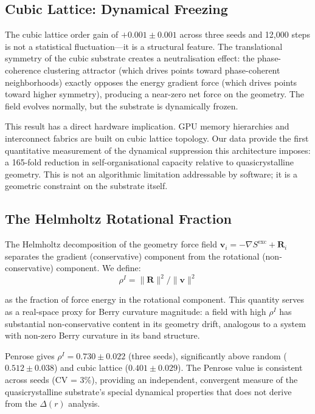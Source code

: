 \documentclass[11pt,a4paper]{article}
\begin{document}
\subsection{Cubic Lattice: Dynamical Freezing}

The cubic lattice order gain of $+0.001 \pm 0.001$ across three seeds and 12,000 steps is not a statistical fluctuation---it is a structural feature. The translational symmetry of the cubic substrate creates a neutralisation effect: the phase-coherence clustering attractor (which drives points toward phase-coherent neighborhoods) exactly opposes the energy gradient force (which drives points toward higher symmetry), producing a near-zero net force on the geometry. The field evolves normally, but the substrate is dynamically frozen.

This result has a direct hardware implication. GPU memory hierarchies and interconnect fabrics are built on cubic lattice topology. Our data provide the first quantitative measurement of the dynamical suppression this architecture imposes: a 165-fold reduction in self-organisational capacity relative to quasicrystalline geometry. This is not an algorithmic limitation addressable by software; it is a geometric constraint on the substrate itself.

\subsection{The Helmholtz Rotational Fraction}

The Helmholtz decomposition of the geometry force field $\mathbf{v}_i = -\nabla S^{\text{exc}} + \mathbf{R}_i$ separates the gradient (conservative) component from the rotational (non-conservative) component. We define:
\begin{equation}
\rho^I = \|\mathbf{R}\|^2 / \|\mathbf{v}\|^2
\end{equation}

as the fraction of force energy in the rotational component. This quantity serves as a real-space proxy for Berry curvature magnitude: a field with high $\rho^I$ has substantial non-conservative content in its geometry drift, analogous to a system with non-zero Berry curvature in its band structure.

Penrose gives $\rho^I = 0.730 \pm 0.022$ (three seeds), significantly above random ($0.512 \pm 0.038$) and cubic lattice ($0.401 \pm 0.029$). The Penrose value is consistent across seeds (CV = 3\%), providing an independent, convergent measure of the quasicrystalline substrate's special dynamical properties that does not derive from the $\Delta(r)$ analysis.
\end{document}

